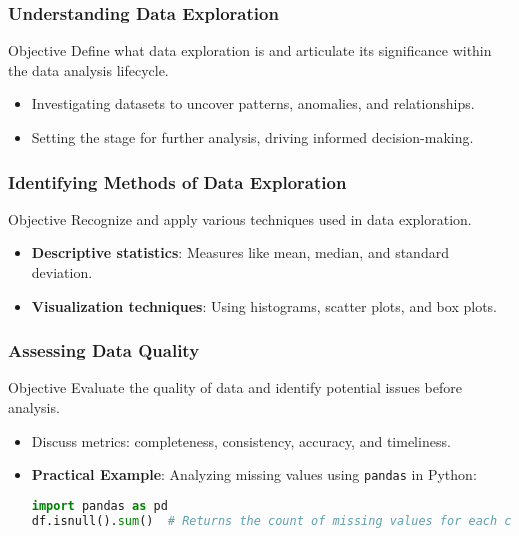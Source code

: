 \documentclass[aspectratio=169]{beamer}
\begin{document}
\begin{frame}[fragile]
    \frametitle{Understanding Data Exploration}
    \begin{block}{Objective}
        Define what data exploration is and articulate its significance within the data analysis lifecycle.
    \end{block}
    \begin{itemize}
        \item Investigating datasets to uncover patterns, anomalies, and relationships.
        \item Setting the stage for further analysis, driving informed decision-making.
    \end{itemize}
\end{frame}

\begin{frame}[fragile]
    \frametitle{Identifying Methods of Data Exploration}
    \begin{block}{Objective}
        Recognize and apply various techniques used in data exploration.
    \end{block}
    \begin{itemize}
        \item \textbf{Descriptive statistics}: Measures like mean, median, and standard deviation.
        \item \textbf{Visualization techniques}: Using histograms, scatter plots, and box plots.
    \end{itemize}
\end{frame}

\begin{frame}[fragile]
    \frametitle{Assessing Data Quality}
    \begin{block}{Objective}
        Evaluate the quality of data and identify potential issues before analysis.
    \end{block}
    \begin{itemize}
        \item Discuss metrics: completeness, consistency, accuracy, and timeliness.
        \item \textbf{Practical Example}: Analyzing missing values using \texttt{pandas} in Python:
        \begin{lstlisting}[language=Python]
import pandas as pd
df.isnull().sum()  # Returns the count of missing values for each column
        \end{lstlisting}
    \end{itemize}
\end{frame}
\end{document}

